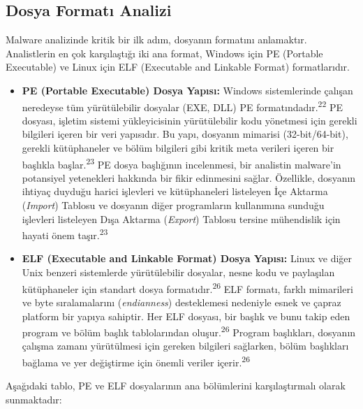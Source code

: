 \subsection{Dosya Formatı Analizi}

Malware analizinde kritik bir ilk adım, dosyanın formatını anlamaktır. Analistlerin en çok karşılaştığı iki ana format, Windows için PE (Portable Executable) ve Linux için ELF (Executable and Linkable Format) formatlarıdır.

\begin{itemize}
    \item \textbf{PE (Portable Executable) Dosya Yapısı:} Windows sistemlerinde çalışan neredeyse tüm yürütülebilir dosyalar (EXE, DLL) PE formatındadır.\textsuperscript{22} PE dosyası, işletim sistemi yükleyicisinin yürütülebilir kodu yönetmesi için gerekli bilgileri içeren bir veri yapısıdır. Bu yapı, dosyanın mimarisi (32-bit/64-bit), gerekli kütüphaneler ve bölüm bilgileri gibi kritik meta verileri içeren bir başlıkla başlar.\textsuperscript{23} PE dosya başlığının incelenmesi, bir analistin malware'in potansiyel yetenekleri hakkında bir fikir edinmesini sağlar. Özellikle, dosyanın ihtiyaç duyduğu harici işlevleri ve kütüphaneleri listeleyen İçe Aktarma (\textit{Import}) Tablosu ve dosyanın diğer programların kullanımına sunduğu işlevleri listeleyen Dışa Aktarma (\textit{Export}) Tablosu tersine mühendislik için hayati önem taşır.\textsuperscript{23}
    \item \textbf{ELF (Executable and Linkable Format) Dosya Yapısı:} Linux ve diğer Unix benzeri sistemlerde yürütülebilir dosyalar, nesne kodu ve paylaşılan kütüphaneler için standart dosya formatıdır.\textsuperscript{26} ELF formatı, farklı mimarileri ve byte sıralamalarını (\textit{endianness}) desteklemesi nedeniyle esnek ve çapraz platform bir yapıya sahiptir. Her ELF dosyası, bir başlık ve bunu takip eden program ve bölüm başlık tablolarından oluşur.\textsuperscript{26} Program başlıkları, dosyanın çalışma zamanı yürütülmesi için gereken bilgileri sağlarken, bölüm başlıkları bağlama ve yer değiştirme için önemli veriler içerir.\textsuperscript{26}
\end{itemize}

Aşağıdaki tablo, PE ve ELF dosyalarının ana bölümlerini karşılaştırmalı olarak sunmaktadır:

